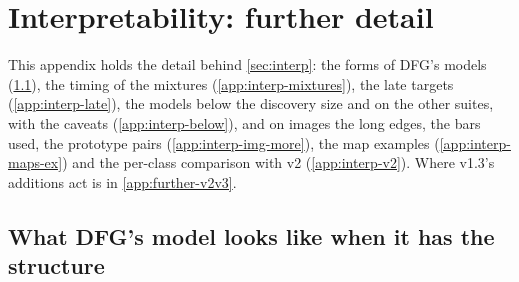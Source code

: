 \section{Interpretability: further detail}\label{app:interp-detail}

This appendix holds the detail behind \cref{sec:interp}: the forms of DFG's models (\cref{app:interp-forms}), the timing of the mixtures (\cref{app:interp-mixtures}), the late targets (\cref{app:interp-late}), the models below the discovery size and on the other suites, with the caveats (\cref{app:interp-below}), and on images the long edges, the bars used, the prototype pairs (\cref{app:interp-img-more}), the map examples (\cref{app:interp-maps-ex}) and the per-class comparison with v2 (\cref{app:interp-v2}). Where v1.3's additions act is in \cref{app:further-v2v3}.

\subsection{What DFG's model looks like when it has the structure}\label{app:interp-forms}

